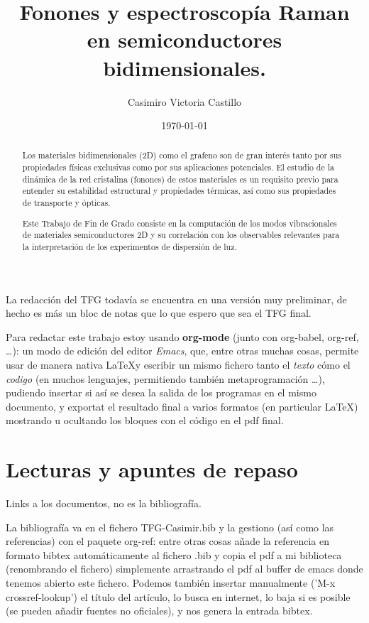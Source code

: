 \documentclass[12pt,a4paper]{article}
\author{Casimiro Victoria Castillo}
\date{\today}
\title{Fonones y espectroscopía Raman en semiconductores bidimensionales.}
\begin{document}
\maketitle
\tableofcontents

\begin{abstract}
Los materiales bidimensionales (2D) como el grafeno son de gran interés tanto por sus
propiedades físicas exclusivas como por sus aplicaciones potenciales. El estudio de la dinámica de la red cristalina (fonones) de estos materiales es un requisito previo para entender su estabilidad estructural y propiedades térmicas, así como sus propiedades de transporte y ópticas.


Este Trabajo de Fin de Grado consiste en la computación de los modos vibracionales de
materiales semiconductores 2D y su correlación con los observables relevantes para la interpretación de los experimentos de dispersión de luz.

\end{abstract}

\color{blue}
La redacción del TFG todavía se encuentra en una versión muy preliminar, de hecho es más un bloc de notas que lo que espero que sea el TFG final.

Para redactar este trabajo estoy usando \textbf{org-mode} (junto con org-babel, org-ref, \ldots{}): un modo de edición del editor \emph{Emacs}, que, entre otras muchas cosas, permite usar de manera nativa \LaTeX y escribir un mismo fichero tanto el \emph{texto} cómo el \emph{codigo} (en muchos lenguajes, permitiendo también metaprogramación \ldots{}), pudiendo insertar si así se desea la salida de los programas en el mismo documento, y exportat el resultado final a varios formatos (en particular \LaTeX) mostrando u ocultando los bloques con el código en el pdf final.


\normalcolor
\newpage

\section{Lecturas y apuntes de repaso}
\label{sec:org49948e8}

Links a los documentos, no es la bibliografía.

La bibliografía va en el fichero TFG-Casimir.bib y la gestiono (así como las referencias) con el paquete org-ref: entre otras cosas añade la referencia en formato bibtex automáticamente al fichero .bib y copia el pdf a mi biblioteca (renombrando el fichero) simplemente arrastrando el pdf al buffer de emacs donde tenemos abierto este fichero. Podemos también insertar manualmente ('M-x crossref-lookup') el título del artículo, lo busca en internet, lo baja si es posible (se pueden añadir fuentes no oficiales), y nos genera la entrada bibtex.
\end{document}
